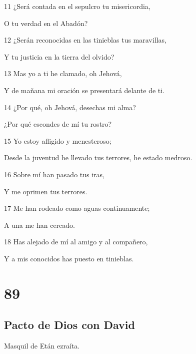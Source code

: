 \par 11 ¿Será contada en el sepulcro tu misericordia,
\par O tu verdad en el Abadón?
\par 12 ¿Serán reconocidas en las tinieblas tus maravillas,
\par Y tu justicia en la tierra del olvido?
\par 13 Mas yo a ti he clamado, oh Jehová,
\par Y de mañana mi oración se presentará delante de ti.
\par 14 ¿Por qué, oh Jehová, desechas mi alma?
\par ¿Por qué escondes de mí tu rostro?
\par 15 Yo estoy afligido y menesteroso;
\par Desde la juventud he llevado tus terrores, he estado medroso.
\par 16 Sobre mí han pasado tus iras,
\par Y me oprimen tus terrores.
\par 17 Me han rodeado como aguas continuamente;
\par A una me han cercado.
\par 18 Has alejado de mí al amigo y al compañero,
\par Y a mis conocidos has puesto en tinieblas.

\chapter{89}

\section*{Pacto de Dios con David}

\par Masquil de Etán ezraíta.

